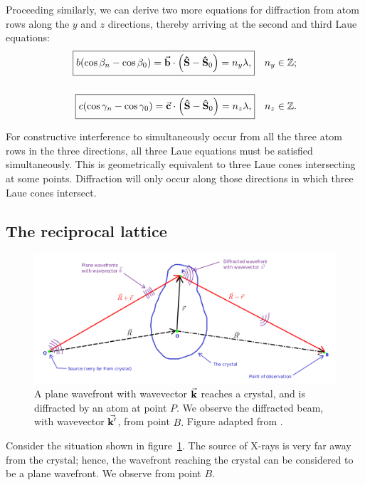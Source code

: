 	Proceeding similarly, we can derive two more equations for diffraction from atom rows along the $y$ and $z$ directions, thereby arriving at the second and third Laue equations:%
%		
	\begin{align}
	\boxed{b \qty( \cos \beta_n - \cos \beta_0 ) = \va{b} \cdot \qty( \vu{S} - \vu{S}_0 ) = n_y \lambda,} \quad n_y \in \mathbb{Z}; \label{eq:2nd_laue_eqn} \\[1.5em]
	\boxed{c \qty( \cos \gamma_n - \cos \gamma_0 ) = \va{c} \cdot \qty( \vu{S} - \vu{S}_0 ) = n_z \lambda,} \quad n_z \in \mathbb{Z}. \label{eq:3rd_laue_eqn}
	\end{align}
	
	For constructive interference to simultaneously occur from all the three atom rows in the three directions, all three Laue equations must be satisfied simultaneously. This is geometrically equivalent to three Laue cones intersecting at some points. Diffraction will only occur along those directions in which three Laue cones intersect.
	


\subsection{The reciprocal lattice}

	\begin{figure}
	\centering
	\includegraphics[width=\textwidth]{reciprocal_lattice.png}
	\caption{\label{fig:reciprocal_lattice}A plane wavefront with wavevector $\va{k}$ reaches a crystal, and is diffracted by an atom at point $P.$ We observe the diffracted beam, with wavevector $\va{k'}$, from point $B.$ Figure adapted from \cite{Harbola2021}.}
	\end{figure}

	Consider the situation shown in figure~\ref{fig:reciprocal_lattice}. The source of X-rays is very far away from the crystal; hence, the wavefront reaching the crystal can be considered to be a plane wavefront. We observe from point $B.$
	
